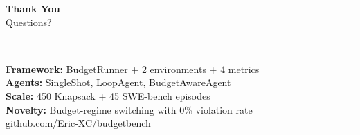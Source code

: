 \documentclass[aspectratio=169, 12pt]{beamer}
\begin{document}
{
\begin{frame}[plain]
  \vspace{1.5cm}
  {\Huge\color{white}\textbf{Thank You}}\\[0.3cm]
  {\Large\color{accent!60!white}Questions?}\\[0.8cm]
  {\color{accent!40!white}\rule{3cm}{0.5pt}}\\[0.4cm]
  {\color{white}\footnotesize
    \textbf{Framework:} BudgetRunner + 2 environments + 4 metrics\\[0.1cm]
    \textbf{Agents:} SingleShot, LoopAgent, BudgetAwareAgent\\[0.1cm]
    \textbf{Scale:} 450 Knapsack + 45 SWE-bench episodes\\[0.1cm]
    \textbf{Novelty:} Budget-regime switching with 0\% violation rate
  }\\[0.5cm]
  {\small\color{gray}github.com/Eric-XC/budgetbench}
\end{frame}
}
\end{document}
